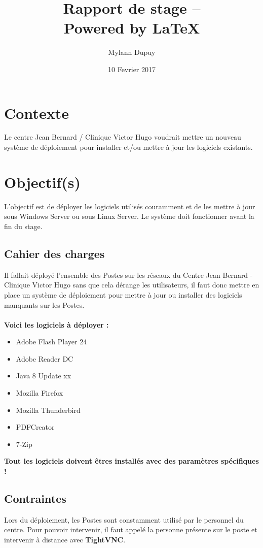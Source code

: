 \documentclass[11pt,a4paper,oneside]{article}
\author{Mylann Dupuy}
\title{Rapport de stage --  \\ Powered by \LaTeX}
\date{10 Fevrier 2017}
\begin{document}
\maketitle
\newpage
\tableofcontents
\newpage
\section{Contexte}
Le centre Jean Bernard / Clinique Victor Hugo voudrait mettre un nouveau système de déploiement pour installer et/ou mettre à jour les logiciels existants.

\section{Objectif(s)}
L'objectif est de déployer les logiciels utilisés couramment et de les mettre à jour sous Windows Server ou sous Linux Server. Le système doit fonctionner avant la fin du stage. 

\subsection{Cahier des charges}
Il fallait déployé l'ensemble des Postes sur les réseaux du Centre Jean Bernard - Clinique Victor Hugo sans que cela dérange les utilisateurs, il faut donc mettre en place un système de déploiement pour mettre à jour ou installer des logiciels manquants sur les Postes.\\ \\
\textbf{Voici les logiciels à déployer :}\\

\begin{itemize}
	\item Adobe Flash Player 24
	\item Adobe Reader DC
	\item Java 8 Update xx
	\item Mozilla Firefox
	\item Mozilla Thunderbird
	\item PDFCreator
	\item 7-Zip
\end{itemize}

\begin{center}
\textbf{Tout les logiciels doivent êtres installés avec des paramètres spécifiques !}
\end{center}
\subsection{Contraintes}
Lors du déploiement, les Postes sont constamment utilisé par le personnel du centre. Pour pouvoir intervenir, il faut appelé la personne présente sur le poste et intervenir à distance avec \textbf{TightVNC}.\\
\end{document}
